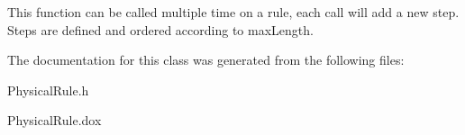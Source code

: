 This function can be called multiple time on a rule, each call will add a new step. Steps are defined and ordered according to {\ttfamily max\+Length}. 

The documentation for this class was generated from the following files\+:\begin{DoxyCompactItemize}
\item 
Physical\+Rule.\+h\item 
Physical\+Rule.\+dox\end{DoxyCompactItemize}
